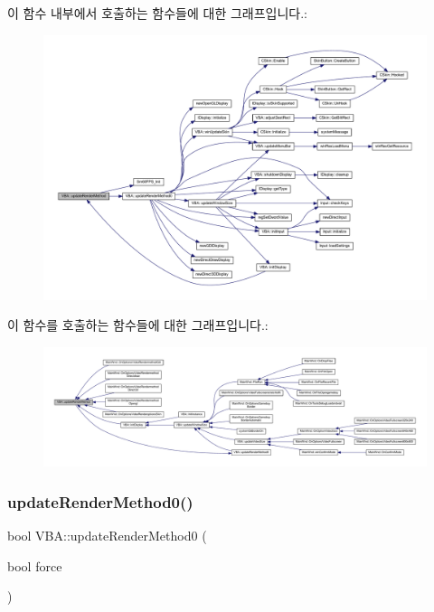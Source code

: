 이 함수 내부에서 호출하는 함수들에 대한 그래프입니다.\+:
\nopagebreak
\begin{figure}[H]
\begin{center}
\leavevmode
\includegraphics[width=350pt]{class_v_b_a_a1d5b9c4597d5c565ce4d8ba1e594a89f_cgraph}
\end{center}
\end{figure}
이 함수를 호출하는 함수들에 대한 그래프입니다.\+:
\nopagebreak
\begin{figure}[H]
\begin{center}
\leavevmode
\includegraphics[width=350pt]{class_v_b_a_a1d5b9c4597d5c565ce4d8ba1e594a89f_icgraph}
\end{center}
\end{figure}
\mbox{\label{class_v_b_a_a0db47ba257f450e098e7079199385b70}} 
\subsubsection{\texorpdfstring{update\+Render\+Method0()}{updateRenderMethod0()}}
{\footnotesize\ttfamily bool V\+B\+A\+::update\+Render\+Method0 (\begin{DoxyParamCaption}\item[{bool}]{force }\end{DoxyParamCaption})}



